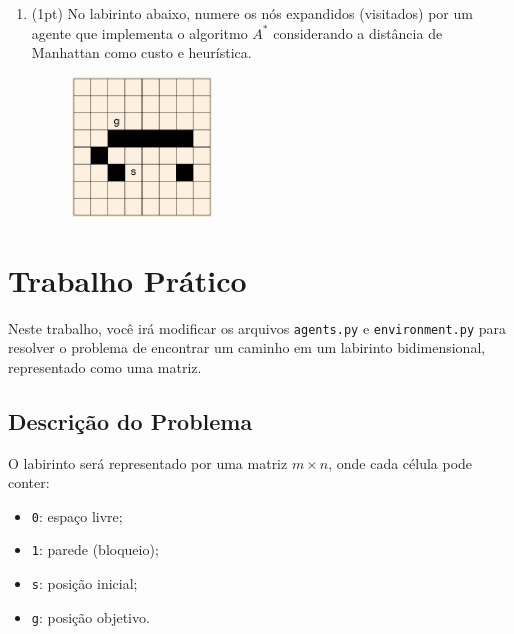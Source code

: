 \documentclass{article}
\begin{document}
\begin{enumerate}
\begin{enumerate}
            \vspace{2cm}
            
            \item (1pt) No labirinto abaixo, numere os nós expandidos (visitados) por um agente que implementa o algoritmo $A^*$ considerando a distância de Manhattan como custo e heurística.
            \begin{figure}[!ht]
                \centering
                \includegraphics[width=0.35\textwidth]{grid.png}
            \end{figure}
            
        \end{enumerate}

\end{enumerate}

\section{Trabalho Prático}

Neste trabalho, você irá modificar os arquivos \texttt{agents.py} e \texttt{environment.py} para resolver o problema de encontrar um caminho em um labirinto bidimensional, representado como uma matriz.

\subsection*{Descrição do Problema}

O labirinto será representado por uma matriz $m \times n$, onde cada célula pode conter:

\begin{itemize}
    \item \texttt{0}: espaço livre;
    \item \texttt{1}: parede (bloqueio);
    \item \texttt{s}: posição inicial;
    \item \texttt{g}: posição objetivo.
\end{itemize}
\end{document}
